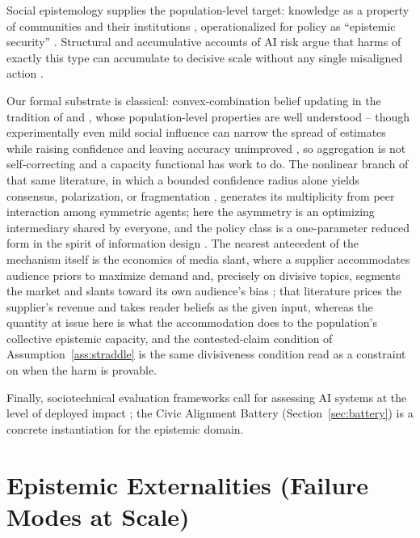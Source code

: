 \documentclass[11pt]{article}
\theoremstyle{definition}
\theoremstyle{remark}
\numberwithin{equation}{section}
\begin{document}
Social epistemology supplies the population-level target: knowledge as a property of communities and their institutions \citep{goldman1999knowledge, anderson2006epistemology, nguyen2020echo}, operationalized for policy as ``epistemic security'' \citep{seger2020tackling}. Structural and accumulative accounts of AI risk argue that harms of exactly this type can accumulate to decisive scale without any single misaligned action \citep{zwetsloot2019thinking, kasirzadeh2025two}.

Our formal substrate is classical: convex-combination belief updating in the tradition of \citet{degroot1974reaching} and \citet{friedkin1990social}, whose population-level properties are well understood \citep{golub2010naive} -- though experimentally even mild social influence can narrow the spread of estimates while raising confidence and leaving accuracy unimproved \citep{lorenz2011social}, so aggregation is not self-correcting and a capacity functional has work to do. The nonlinear branch of that same literature, in which a bounded confidence radius alone yields consensus, polarization, or fragmentation \citep{hegselmann2002opinion, deffuant2000mixing}, generates its multiplicity from peer interaction among symmetric agents; here the asymmetry is an optimizing intermediary shared by everyone, and the policy class is a one-parameter reduced form in the spirit of information design \citep{kamenica2011bayesian}. The nearest antecedent of the mechanism itself is the economics of media slant, where a supplier accommodates audience priors to maximize demand and, precisely on divisive topics, segments the market and slants toward its own audience's bias \citep{mullainathan2005market, gentzkow2006media}; that literature prices the supplier's revenue and takes reader beliefs as the given input, whereas the quantity at issue here is what the accommodation does to the population's collective epistemic capacity, and the contested-claim condition of Assumption~\ref{ass:straddle} is the same divisiveness condition read as a constraint on when the harm is provable.

Finally, sociotechnical evaluation frameworks call for assessing AI systems at the level of deployed impact \citep{weidinger2023sociotechnical, solaiman2025evaluating}; the Civic Alignment Battery (Section~\ref{sec:battery}) is a concrete instantiation for the epistemic domain.

\section{Epistemic Externalities (Failure Modes at Scale)}\label{sec:externalities}
\end{document}
